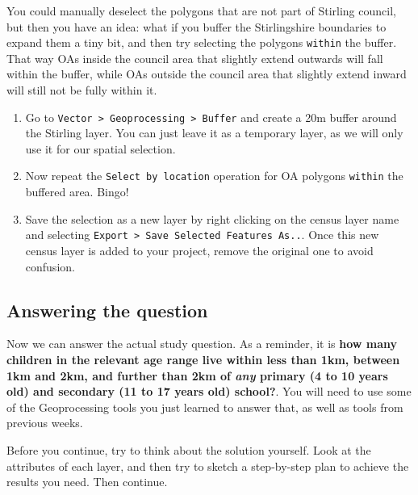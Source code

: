\documentclass[
  letterpaper,
  DIV=11,
  numbers=noendperiod]{scrreprt}
\begin{document}
You could manually deselect the polygons that are not part of Stirling
council, but then you have an idea: what if you buffer the Stirlingshire
boundaries to expand them a tiny bit, and then try selecting the
polygons \texttt{within} the buffer. That way OAs inside the council
area that slightly extend outwards will fall within the buffer, while
OAs outside the council area that slightly extend inward will still not
be fully within it.

\begin{enumerate}
\def\labelenumi{(\arabic{enumi})}
\setcounter{enumi}{292}
\item
  Go to
  \texttt{Vector\ \textgreater{}\ Geoprocessing\ \textgreater{}\ Buffer}
  and create a 20m buffer around the Stirling layer. You can just leave
  it as a temporary layer, as we will only use it for our spatial
  selection.
\item
  Now repeat the \texttt{Select\ by\ location} operation for OA polygons
  \texttt{within} the buffered area. Bingo!
\item
  Save the selection as a new layer by right clicking on the census
  layer name and selecting
  \texttt{Export\ \textgreater{}\ Save\ Selected\ Features\ As..}. Once
  this new census layer is added to your project, remove the original
  one to avoid confusion.
\end{enumerate}

\subsection{Answering the question}\label{answering-the-question}

Now we can answer the actual study question. As a reminder, it is
\textbf{how many children in the relevant age range live within less
than 1km, between 1km and 2km, and further than 2km of \emph{any}
primary (4 to 10 years old) and secondary (11 to 17 years old) school?}.
You will need to use some of the Geoprocessing tools you just learned to
answer that, as well as tools from previous weeks.

\begin{tcolorbox}[enhanced jigsaw, breakable, toptitle=1mm, colback=white, left=2mm, leftrule=.75mm, titlerule=0mm, colframe=quarto-callout-important-color-frame, opacityback=0, title=\textcolor{quarto-callout-important-color}{\faExclamation}\hspace{0.5em}{Stop and Think}, toprule=.15mm, opacitybacktitle=0.6, bottomtitle=1mm, colbacktitle=quarto-callout-important-color!10!white, bottomrule=.15mm, coltitle=black, rightrule=.15mm, arc=.35mm]

Before you continue, try to think about the solution yourself. Look at
the attributes of each layer, and then try to sketch a step-by-step plan
to achieve the results you need. Then continue.

\end{tcolorbox}
\end{document}
